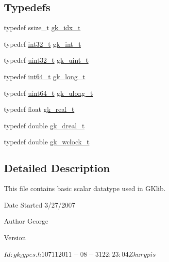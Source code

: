 \subsection*{Typedefs}
\begin{DoxyCompactItemize}
\item 
typedef ssize\+\_\+t \hyperlink{a00083_a899f9d8c47b1ca0c2fead41097f4bde2}{gk\+\_\+idx\+\_\+t}
\item 
typedef \hyperlink{a00119_a37994e3b11c72957c6f454c6ec96d43d}{int32\+\_\+t} \hyperlink{a00083_a483fe5b5f4afc7f8f851848cb8c382c3}{gk\+\_\+int\+\_\+t}
\item 
typedef \hyperlink{a00119_a6eb1e68cc391dd753bc8ce896dbb8315}{uint32\+\_\+t} \hyperlink{a00083_a0c55a01ae39bf39a8445c672d5764907}{gk\+\_\+uint\+\_\+t}
\item 
typedef \hyperlink{a00119_a67a9885ef4908cb72ce26d75b694386c}{int64\+\_\+t} \hyperlink{a00083_a99d4f252f4b2737c17a164864764f181}{gk\+\_\+long\+\_\+t}
\item 
typedef \hyperlink{a00119_aec6fcb673ff035718c238c8c9d544c47}{uint64\+\_\+t} \hyperlink{a00083_ab49b2a821da04fc03fdd70410ceedd72}{gk\+\_\+ulong\+\_\+t}
\item 
typedef float \hyperlink{a00083_a7329b7b1feb0f0e9bd2dfb8beb994ae8}{gk\+\_\+real\+\_\+t}
\item 
typedef double \hyperlink{a00083_a2afb73f3d86217c0177060ce08eded5d}{gk\+\_\+dreal\+\_\+t}
\item 
typedef double \hyperlink{a00083_a6108a54ce43fb11539dae45074f2ba04}{gk\+\_\+wclock\+\_\+t}
\end{DoxyCompactItemize}


\subsection{Detailed Description}
This file contains basic scalar datatype used in G\+Klib. 

\begin{DoxyDate}{Date}
Started 3/27/2007 
\end{DoxyDate}
\begin{DoxyAuthor}{Author}
George 
\end{DoxyAuthor}
\begin{DoxyVersion}{Version}
\begin{DoxyVerb}$Id: gk_types.h 10711 2011-08-31 22:23:04Z karypis $ \end{DoxyVerb}
 
\end{DoxyVersion}


